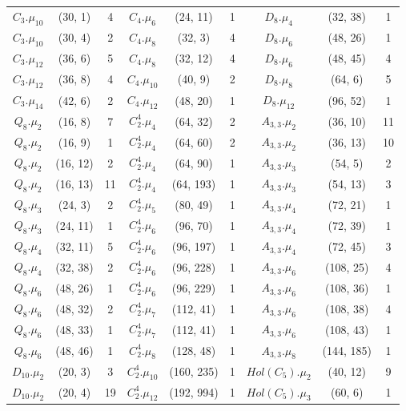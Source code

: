 {\begin{longtable}{ccc|ccc|ccc}
$C_3.\mu_{10}$&(30, 1)&4   &  $C_4.\mu_{6}$&(24, 11)&1 & $D_8.\mu_{4}$&(32, 38)&1\\
\rowcolor{lightgray}
$C_3.\mu_{10}$&(30, 4)&2   &  $C_4.\mu_{8}$&(32, 3)&4 & $D_8.\mu_{6}$&(48, 26)&1\\
$C_3.\mu_{12}$&(36, 6)&5   &  $C_4.\mu_{8}$&(32, 12)&4 & $D_8.\mu_{6}$&(48, 45)&4\\
\rowcolor{lightgray}
$C_3.\mu_{12}$&(36, 8)&4   &  $C_4.\mu_{10}$&(40, 9)&2 & $D_8.\mu_{8}$&(64, 6)&5\\
$C_3.\mu_{14}$&(42, 6)&2   &  $C_4.\mu_{12}$&(48, 20)&1 & $D_8.\mu_{12}$&(96, 52)&1\\
\rowcolor{lightgray}
$Q_8.\mu_{2}$&(16, 8)&7 & $C_2^4.\mu_{4}$&(64, 32)&2 & $A_{3,3}.\mu_{2}$&(36, 10)&11\\
$Q_8.\mu_{2}$&(16, 9)&1 & $C_2^4.\mu_{4}$&(64, 60)&2 & $A_{3,3}.\mu_{2}$&(36, 13)&10\\
\rowcolor{lightgray}
$Q_8.\mu_{2}$&(16, 12)&2 & $C_2^4.\mu_{4}$&(64, 90)&1 & $A_{3,3}.\mu_{3}$&(54, 5)&2\\
$Q_8.\mu_{2}$&(16, 13)&11 & $C_2^4.\mu_{4}$&(64, 193)&1 & $A_{3,3}.\mu_{3}$&(54, 13)&3\\
\rowcolor{lightgray}
$Q_8.\mu_{3}$&(24, 3)&2 & $C_2^4.\mu_{5}$&(80, 49)&1 & $A_{3,3}.\mu_{4}$&(72, 21)&1\\
$Q_8.\mu_{3}$&(24, 11)&1 & $C_2^4.\mu_{6}$&(96, 70)&1 & $A_{3,3}.\mu_{4}$&(72, 39)&1\\
\rowcolor{lightgray}
$Q_8.\mu_{4}$&(32, 11)&5 & $C_2^4.\mu_{6}$&(96, 197)&1 & $A_{3,3}.\mu_{4}$&(72, 45)&3\\
$Q_8.\mu_{4}$&(32, 38)&2 & $C_2^4.\mu_{6}$&(96, 228)&1 & $A_{3,3}.\mu_{6}$&(108, 25)&4\\
\rowcolor{lightgray}
$Q_8.\mu_{6}$&(48, 26)&1 & $C_2^4.\mu_{6}$&(96, 229)&1 & $A_{3,3}.\mu_{6}$&(108, 36)&1\\
$Q_8.\mu_{6}$&(48, 32)&2 & $C_2^4.\mu_{7}$&(112, 41)&1 & $A_{3,3}.\mu_{6}$&(108, 38)&4\\
\rowcolor{lightgray}
$Q_8.\mu_{6}$&(48, 33)&1 & $C_2^4.\mu_{7}$&(112, 41)&1 & $A_{3,3}.\mu_{6}$&(108, 43)&1\\
$Q_8.\mu_{6}$&(48, 46)&1 & $C_2^4.\mu_{8}$&(128, 48)&1 & $A_{3,3}.\mu_{8}$&(144, 185)&1\\
\rowcolor{lightgray}
$D_{10}.\mu_{2}$&(20, 3)&3 & $C_2^4.\mu_{10}$&(160, 235)&1 & $Hol(C_5).\mu_{2}$&(40, 12)&9\\
$D_{10}.\mu_{2}$&(20, 4)&19 & $C_2^4.\mu_{12}$&(192, 994)&1 & $Hol(C_5).\mu_{3}$&(60, 6)&1\\

\end{longtable}}
